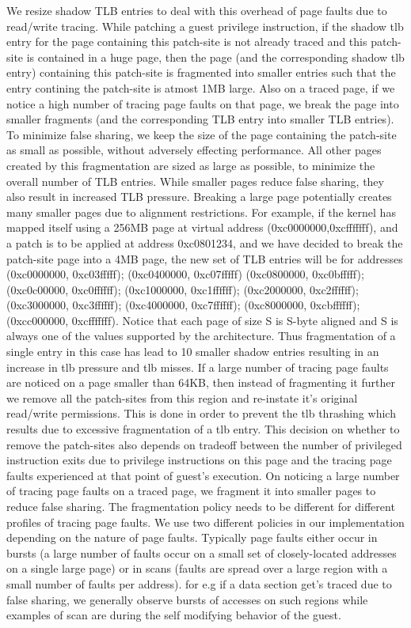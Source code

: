 We resize shadow TLB entries to deal with this overhead of page faults due to read/write tracing. While patching a guest privilege instruction, if the shadow tlb entry for the page containing this patch-site is not already traced and this patch-site is contained in a huge page, then the page (and the corresponding shadow tlb entry) containing this patch-site is fragmented into smaller entries such that the entry contining the patch-site is atmost 1MB large. Also on a traced page, if we notice a high number of tracing page faults on that page, we break the page into smaller fragments (and the corresponding TLB entry into smaller TLB entries). To minimize false sharing, we keep the size of the page containing the patch-site as small as possible, without adversely effecting performance. All other pages created by this fragmentation are sized as large as possible, to minimize the overall number of TLB entries. While smaller pages reduce false sharing, they also result in increased TLB pressure.
Breaking a large page potentially creates many smaller pages due to alignment restrictions. For example, if the kernel has mapped itself using a 256MB page at virtual address (0xc0000000,0xcfffffff), and a patch is to be applied at address 0xc0801234, and we have decided to break the patch-site page into a 4MB page, the new set of TLB entries will be for addresses (0xc0000000, 0xc03fffff); (0xc0400000, 0xc07fffff) (0xc0800000, 0xc0bfffff); (0xc0c00000, 0xc0ffffff); (0xc1000000, 0xc1ffffff); (0xc2000000, 0xc2ffffff); (0xc3000000, 0xc3ffffff); (0xc4000000, 0xc7ffffff); (0xc8000000, 0xcbffffff); (0xcc000000, 0xcfffffff). Notice that each page of size S is S-byte aligned and S is always one of the values supported by the architecture. Thus fragmentation of a single entry in this case has lead to 10 smaller shadow entries resulting in an increase in tlb pressure and tlb misses.
If a large number of tracing page faults are noticed on a page smaller than 64KB, then instead of fragmenting it further we remove all the patch-sites from this region and re-instate it's original read/write permissions. This is done in order to prevent the tlb thrashing which results due to excessive fragmentation of a tlb entry. This decision on whether to remove the patch-sites also depends on tradeoff between the number of privileged instruction exits due to privilege instructions on this page and the tracing page faults experienced at that point of guest's execution.
On noticing a large number of tracing page faults on a traced page, we fragment it into smaller pages to reduce false sharing. The fragmentation policy needs to be different for different profiles of tracing page faults. We use two different policies in our implementation depending on the nature of page faults. Typically page faults either occur in bursts (a large number of faults occur on a  small set of closely-located addresses on a single large page) or in scans (faults are spread over a large region with a small number of faults per address). for e.g if a data section get's traced due to false sharing, we generally observe bursts of accesses on such regions while examples of scan are during the self modifying behavior of the guest. 

